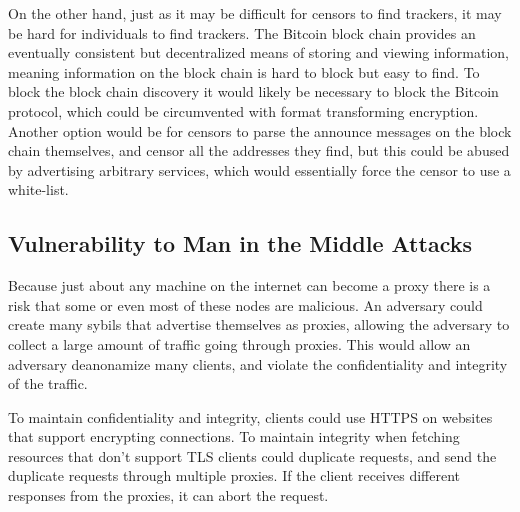 On the other hand, just as it may be difficult for censors to find trackers, it may be hard for individuals to find trackers. The Bitcoin block chain provides an eventually consistent but decentralized means of storing and viewing information, meaning information on the block chain is hard to block but easy to find. To block the block chain discovery it would likely be necessary to block the Bitcoin protocol, which could be circumvented with format transforming encryption. Another option would be for censors to parse the announce messages on the block chain themselves, and censor all the addresses they find, but this could be abused by advertising arbitrary services, which would essentially force the censor to use a white-list.

\subsection{Vulnerability to Man in the Middle Attacks}
\label{sec:mitm}

Because just about any machine on the internet can become a proxy there is a risk that some or even most of these nodes are malicious. An adversary could create many sybils that advertise themselves as proxies, allowing the adversary to collect a large amount of traffic going through proxies. This would allow an adversary deanonamize many clients, and violate the confidentiality and integrity of the traffic.

To maintain confidentiality and integrity, clients could use HTTPS on websites that support encrypting connections. To maintain integrity when fetching resources that don't support TLS clients could duplicate requests, and send the duplicate requests through multiple proxies. If the client receives different responses from the proxies, it can abort the request.